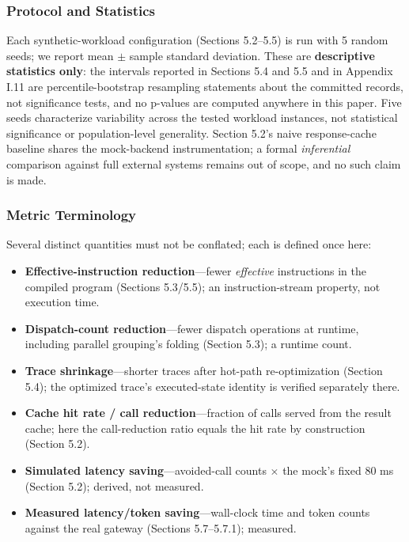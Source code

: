 \documentclass[
  sigconf,
  anonymous]{acmart}
\providecommand{\tightlist}{%
  \setlength{\itemsep}{0pt}\setlength{\parskip}{0pt}}
\begin{document}
\subsubsection{Protocol and Statistics}\label{protocol-and-statistics}

Each synthetic-workload configuration (Sections 5.2--5.5) is run with 5
random seeds; we report mean \(\pm\) sample standard deviation. These
are \textbf{descriptive statistics only}: the intervals reported in
Sections 5.4 and 5.5 and in Appendix I.11 are percentile-bootstrap
resampling statements about the committed records, not significance
tests, and no p-values are computed anywhere in this paper. Five seeds
characterize variability across the tested workload instances, not
statistical significance or population-level generality. Section 5.2's
naive response-cache baseline shares the mock-backend instrumentation; a
formal \emph{inferential} comparison against full external systems
remains out of scope, and no such claim is made.

\subsubsection{Metric Terminology}\label{metric-terminology}

Several distinct quantities must not be conflated; each is defined once
here:

\begin{itemize}
\tightlist
\item
  \textbf{Effective-instruction reduction}---fewer \emph{effective}
  instructions in the compiled program (Sections 5.3/5.5); an
  instruction-stream property, not execution time.
\item
  \textbf{Dispatch-count reduction}---fewer dispatch operations at
  runtime, including parallel grouping's folding (Section 5.3); a
  runtime count.
\item
  \textbf{Trace shrinkage}---shorter traces after hot-path
  re-optimization (Section 5.4); the optimized trace's executed-state
  identity is verified separately there.
\item
  \textbf{Cache hit rate / call reduction}---fraction of calls served
  from the result cache; here the call-reduction ratio equals the hit
  rate by construction (Section 5.2).
\item
  \textbf{Simulated latency saving}---avoided-call counts \(\times\) the
  mock's fixed 80 ms (Section 5.2); derived, not measured.
\item
  \textbf{Measured latency/token saving}---wall-clock time and token
  counts against the real gateway (Sections 5.7--5.7.1); measured.
\end{itemize}
\end{document}
